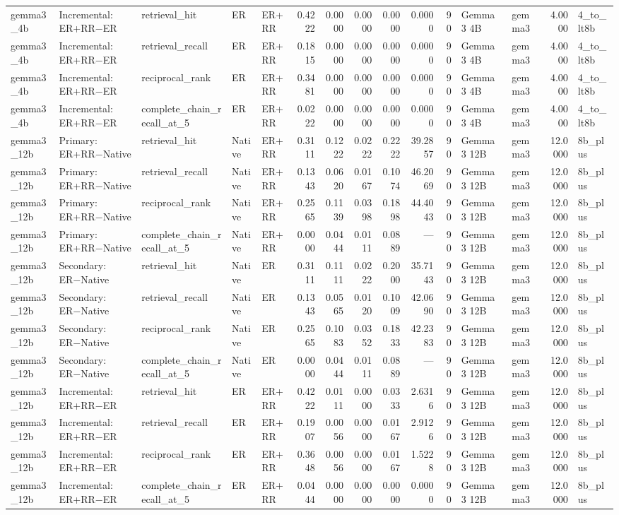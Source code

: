 \begin{tabular}{lllllrrrrrrllrl}
gemma3_4b & Incremental: ER+RR−ER & retrieval_hit & ER & ER+RR & 0.4222 & 0.0000 & 0.0000 & 0.0000 & 0.0000 & 90 & Gemma 3 4B & gemma3 & 4.0000 & 4_to_lt8b \\
gemma3_4b & Incremental: ER+RR−ER & retrieval_recall & ER & ER+RR & 0.1815 & 0.0000 & 0.0000 & 0.0000 & 0.0000 & 90 & Gemma 3 4B & gemma3 & 4.0000 & 4_to_lt8b \\
gemma3_4b & Incremental: ER+RR−ER & reciprocal_rank & ER & ER+RR & 0.3481 & 0.0000 & 0.0000 & 0.0000 & 0.0000 & 90 & Gemma 3 4B & gemma3 & 4.0000 & 4_to_lt8b \\
gemma3_4b & Incremental: ER+RR−ER & complete_chain_recall_at_5 & ER & ER+RR & 0.0222 & 0.0000 & 0.0000 & 0.0000 & 0.0000 & 90 & Gemma 3 4B & gemma3 & 4.0000 & 4_to_lt8b \\
gemma3_12b & Primary: ER+RR−Native & retrieval_hit & Native & ER+RR & 0.3111 & 0.1222 & 0.0222 & 0.2222 & 39.2857 & 90 & Gemma 3 12B & gemma3 & 12.0000 & 8b_plus \\
gemma3_12b & Primary: ER+RR−Native & retrieval_recall & Native & ER+RR & 0.1343 & 0.0620 & 0.0167 & 0.1074 & 46.2069 & 90 & Gemma 3 12B & gemma3 & 12.0000 & 8b_plus \\
gemma3_12b & Primary: ER+RR−Native & reciprocal_rank & Native & ER+RR & 0.2565 & 0.1139 & 0.0398 & 0.1898 & 44.4043 & 90 & Gemma 3 12B & gemma3 & 12.0000 & 8b_plus \\
gemma3_12b & Primary: ER+RR−Native & complete_chain_recall_at_5 & Native & ER+RR & 0.0000 & 0.0444 & 0.0111 & 0.0889 & — & 90 & Gemma 3 12B & gemma3 & 12.0000 & 8b_plus \\
gemma3_12b & Secondary: ER−Native & retrieval_hit & Native & ER & 0.3111 & 0.1111 & 0.0222 & 0.2000 & 35.7143 & 90 & Gemma 3 12B & gemma3 & 12.0000 & 8b_plus \\
gemma3_12b & Secondary: ER−Native & retrieval_recall & Native & ER & 0.1343 & 0.0565 & 0.0120 & 0.1009 & 42.0690 & 90 & Gemma 3 12B & gemma3 & 12.0000 & 8b_plus \\
gemma3_12b & Secondary: ER−Native & reciprocal_rank & Native & ER & 0.2565 & 0.1083 & 0.0352 & 0.1833 & 42.2383 & 90 & Gemma 3 12B & gemma3 & 12.0000 & 8b_plus \\
gemma3_12b & Secondary: ER−Native & complete_chain_recall_at_5 & Native & ER & 0.0000 & 0.0444 & 0.0111 & 0.0889 & — & 90 & Gemma 3 12B & gemma3 & 12.0000 & 8b_plus \\
gemma3_12b & Incremental: ER+RR−ER & retrieval_hit & ER & ER+RR & 0.4222 & 0.0111 & 0.0000 & 0.0333 & 2.6316 & 90 & Gemma 3 12B & gemma3 & 12.0000 & 8b_plus \\
gemma3_12b & Incremental: ER+RR−ER & retrieval_recall & ER & ER+RR & 0.1907 & 0.0056 & 0.0000 & 0.0167 & 2.9126 & 90 & Gemma 3 12B & gemma3 & 12.0000 & 8b_plus \\
gemma3_12b & Incremental: ER+RR−ER & reciprocal_rank & ER & ER+RR & 0.3648 & 0.0056 & 0.0000 & 0.0167 & 1.5228 & 90 & Gemma 3 12B & gemma3 & 12.0000 & 8b_plus \\
gemma3_12b & Incremental: ER+RR−ER & complete_chain_recall_at_5 & ER & ER+RR & 0.0444 & 0.0000 & 0.0000 & 0.0000 & 0.0000 & 90 & Gemma 3 12B & gemma3 & 12.0000 & 8b_plus \\
\bottomrule
\end{tabular}
